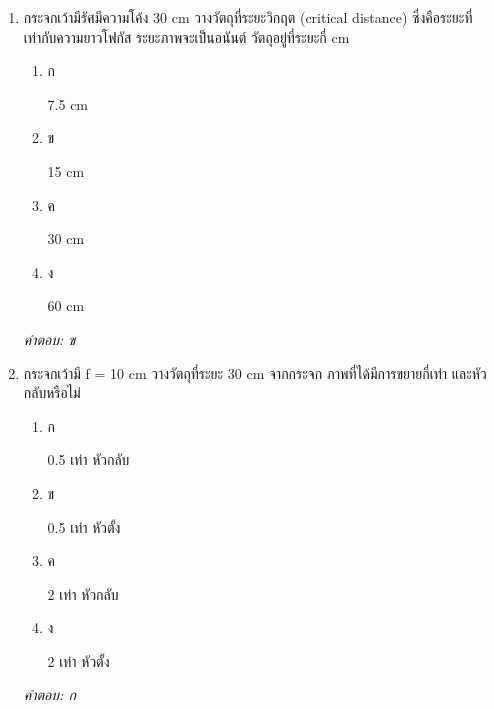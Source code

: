 \documentclass[12pt]{article}
\begin{document}
\begin{enumerate}[label=\arabic*., itemsep=0.5\baselineskip, topsep=0.5\baselineskip, leftmargin=*]
\item กระจกเว้ามีรัศมีความโค้ง 30 cm วางวัตถุที่ระยะวิกฤต (critical distance) ซึ่งคือระยะที่เท่ากับความยาวโฟกัส ระยะภาพจะเป็นอนันต์ วัตถุอยู่ที่ระยะกี่ cm
\begin{enumerate}[label=\alph*)., itemsep=0.3\baselineskip, topsep=0.3\baselineskip]
\item ก\ 
\begin{minipage}[t]{0.9\linewidth}
\raggedright 7.5 cm
\end{minipage}
\item ข\ 
\begin{minipage}[t]{0.9\linewidth}
\raggedright 15 cm
\end{minipage}
\item ค\ 
\begin{minipage}[t]{0.9\linewidth}
\raggedright 30 cm
\end{minipage}
\item ง\ 
\begin{minipage}[t]{0.9\linewidth}
\raggedright 60 cm
\end{minipage}
\end{enumerate}
\vspace{-0.3\baselineskip}
\begin{small}
\textit{คำตอบ: ข}
\end{small}

\item กระจกเว้ามี f = 10 cm วางวัตถุที่ระยะ 30 cm จากกระจก ภาพที่ได้มีการขยายกี่เท่า และหัวกลับหรือไม่
\begin{enumerate}[label=\alph*)., itemsep=0.3\baselineskip, topsep=0.3\baselineskip]
\item ก\ 
\begin{minipage}[t]{0.9\linewidth}
\raggedright 0.5 เท่า หัวกลับ
\end{minipage}
\item ข\ 
\begin{minipage}[t]{0.9\linewidth}
\raggedright 0.5 เท่า หัวตั้ง
\end{minipage}
\item ค\ 
\begin{minipage}[t]{0.9\linewidth}
\raggedright 2 เท่า หัวกลับ
\end{minipage}
\item ง\ 
\begin{minipage}[t]{0.9\linewidth}
\raggedright 2 เท่า หัวตั้ง
\end{minipage}
\end{enumerate}
\vspace{-0.3\baselineskip}
\begin{small}
\textit{คำตอบ: ก}
\end{small}


\end{enumerate}
\end{document}
